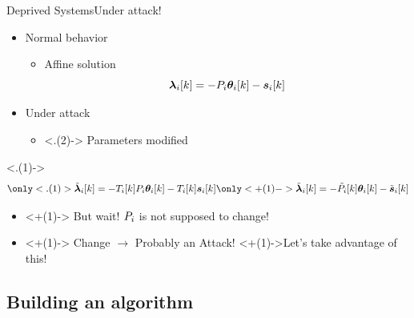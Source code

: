 \documentclass[aspectratio=169]{beamer}
\begin{document}
\begin{frame}{Deprived Systems}{Under attack!}
  \begin{minipage}[t]{.45\linewidth}
    \begin{itemize}[<+->]
      \item Normal behavior
            \begin{itemize}
              \item Affine solution
                    \begin{equation*}
                      \lambdaik=-\Plin\thetaik-\sik
                    \end{equation*}
            \end{itemize}
    \end{itemize}
  \end{minipage}
  \hfill
  \begin{minipage}[t]{.45\linewidth}
    \begin{itemize}
      \item<+-> Under attack \onslide<+->{$\to$ $\lambdaicheat=\Tik\lambdai$}
            \begin{itemize}
              \item<.(2)-> Parameters modified
            \end{itemize}
    \end{itemize}
    \only<.(1)->{
      \begin{equation*}
        \only<.(1)>{\lambdaicheat[k]=-\Tik\Plin\thetaik-\Tik\sik}
        \only<+(1)->{\lambdaicheat[k]=-\Plintilde\thetaik-\siktilde}
      \end{equation*}
    }
  \end{minipage}
  \centering
  \begin{itemize}
    \item<+(1)-> But wait! ${P}_{i}$ is not supposed to change!
    \item<+(1)-> Change $\to$ Probably an Attack! \onslide<+(1)->{Let's take advantage of this!}
  \end{itemize}
\end{frame}

\subsection{Building an algorithm}
\end{document}
